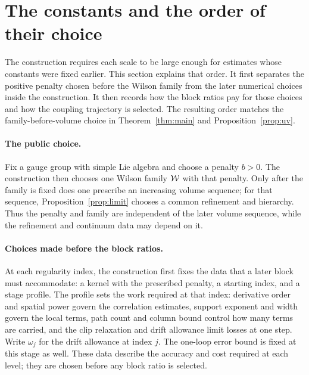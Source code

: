 \section{The constants and the order of their choice}\label{sec:constants}

The construction requires each scale to be large enough for estimates whose constants were fixed earlier. This section explains that order. It first separates the positive penalty chosen before the Wilson family from the later numerical choices inside the construction. It then records how the block ratios pay for those choices and how the coupling trajectory is selected. The resulting order matches the family-before-volume choice in Theorem~\ref{thm:main} and Proposition~\ref{prop:uv}.

\paragraph{The public choice.}
Fix a gauge group with simple Lie algebra and choose a penalty $b>0$. The construction then chooses one Wilson family $\mathcal W$ with that penalty. Only after the family is fixed does one prescribe an increasing volume sequence; for that sequence, Proposition~\ref{prop:limit} chooses a common refinement and hierarchy. Thus the penalty and family are independent of the later volume sequence, while the refinement and continuum data may depend on it.

\paragraph{Choices made before the block ratios.}
At each regularity index, the construction first fixes the data that a later block must accommodate: a kernel with the prescribed penalty, a starting index, and a stage profile. The profile sets the work required at that index: derivative order and spatial power govern the correlation estimates, support exponent and width govern the local terms, path count and column bound control how many terms are carried, and the clip relaxation and drift allowance limit losses at one step. Write $\omega_j$ for the drift allowance at index $j$. The one-loop error bound is fixed at this stage as well. These data describe the accuracy and cost required at each level; they are chosen before any block ratio is selected.


